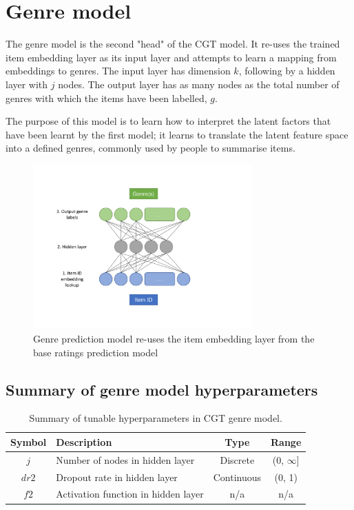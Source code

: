\section{Genre model}
The genre model is the second "head" of the CGT model. It re-uses the trained item embedding layer as its input layer and attempts to learn a mapping from embeddings to genres. The input layer has dimension $k$, following by a hidden layer with $j$ nodes. The output layer has as many nodes as the total number of genres with which the items have been labelled, $g$.

The purpose of this model is to learn how to interpret the latent factors that have been learnt by the first model; it learns to translate the latent feature space into a defined genres, commonly used by people to summarise items.

\begin{figure}[H]
\centering
\includegraphics[width=0.75\textwidth]{Figures/4_genre-model.pdf}
\decoRule
\caption[Genre prediction model]{Genre prediction model re-uses the item embedding layer from the base ratings prediction model}
\label{fig:4_genre-prediction-architecture}
\end{figure}

\subsection{Summary of genre model hyperparameters}
\begin{table}[H]
\centering
\begin{tabular}{c | p{3.5cm} | c | c}
\toprule
\textbf{Symbol} & \textbf{Description} & \textbf{Type} & \textbf{Range} \\
\midrule
$j$ & Number of nodes in hidden layer & Discrete & (0, $\infty$] \\
\midrule
$dr2$ & Dropout rate in hidden layer & Continuous & (0, 1) \\
\midrule
$f2$ & Activation function in hidden layer & n/a & n/a \\
\bottomrule
\end{tabular}
\caption[Genre model hyperparameters]{Summary of tunable hyperparameters in CGT genre model.}
\label{tab:genre-hparams}
\end{table}

